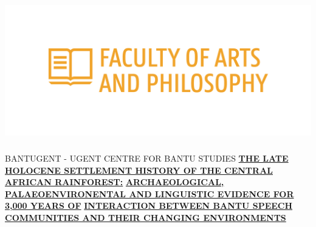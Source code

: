 \documentclass[a0]{sciposter}
\begin{document}
\vspace*{-2cm}\hspace*{-2cm}\includegraphics[width = 14.47cm, height = 6.2cm]{logos/icon_UGent_LW_EN_RGB_2400_color.png}

\colorbox{BoxCol}{
\begin{minipage}[t][102cm][t]{82cm}

\vspace{2cm}\hspace{2cm}\begin{minipage}[t]{77cm}
{\fontsize{50}{52}\selectfont\textcolor{HeadCol}{\uppercase{BantUGent - UGent Centre for Bantu Studies}}}
\bigbreak\bigbreak
{\fontsize{40}{44}}
\bigbreak\bigbreak
{\fontsize{44}{50}\selectfont\textcolor{HeadCol}{\uline{\textbf{\uppercase{The Late Holocene Settlement History of the Central African Rainforest:}}}}}
\bigbreak
{\fontsize{44}{50}\selectfont\textcolor{HeadCol}{\uline{\textbf{\uppercase{Archaeological, Palaeoenvironental and Linguistic Evidence for 3,000 years of}}}}}
\bigbreak
{\fontsize{44}{50}\selectfont\textcolor{HeadCol}{\uline{\textbf{\uppercase{Interaction between Bantu Speech Communities and their Changing Environments}}}}}
\end{minipage}


\end{minipage}}
\end{document}
